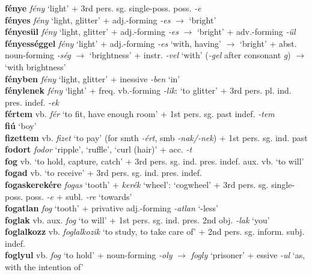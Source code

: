 \documentclass[11pt]{article}
\begin{document}
\textbf{fénye} \emph{fény} `light' + 3rd
pers. sg. single\hyp{}poss. poss. \emph{-e} \\
\textbf{fényes} \emph{fény} `light, glitter' + adj.\hyp{}forming \emph{-es}
$\rightarrow$ `bright' \\
\textbf{fényesül} \emph{fény} `light, glitter' + adj.\hyp{}forming \emph{-es}
$\rightarrow$ `bright' + adv.\hyp{}forming \emph{-ül} \\
\textbf{fényességgel} \emph{fény} `light' + adj.\hyp{}forming \emph{-es}
    `with, having' $\rightarrow$ `bright' + abst. noun\hyp{}forming
  \emph{-ség} $\rightarrow$ `brightness' +
  instr. \emph{-vel} `with' (\emph{-gel} after consonant
  \emph{g}) $\rightarrow$ `with brightness' \\
\textbf{fényben} \emph{fény} `light, glitter' + inessive \emph{-ben}
`in' \\
\textbf{fénylenek} \emph{fény} `light' +
freq. vb.\hyp{}forming \emph{-lik}: `to glitter' + 3rd
pers. pl. ind. pres. indef. \emph{-ek} \\
\textbf{fértem} vb. \emph{fér} `to fit, have enough room' + 1st
pers. sg. past indef. \emph{-tem} \\
\textbf{fiú} `boy' \\
\textbf{fizettem} vb. \emph{fizet} `to pay' (for smth \emph{-ért},
smb \emph{-nak/-nek}) + 1st pers. sg. ind. past \\
\textbf{fodort} \emph{fodor} `ripple', `ruffle', `curl (hair)' +
acc. \emph{-t} \\
\textbf{fog} vb. `to hold, capture, catch' + 3rd
pers. sg. ind. pres. indef. \textbar\textbar{} aux. vb. `to will' \\
\textbf{fogad} vb. `to receive' + 3rd pers. sg. ind. pres. indef. \\
\textbf{fogaskerekére} \emph{fogas} `tooth' + \emph{kerék} `wheel':
`cogwheel' + 3rd pers. sg. single\hyp{}poss. poss. \emph{-e} + subl. \emph{-re}
`towards' \\
\textbf{fogatlan} \emph{fog} `tooth' +
privative adj.\hyp{}forming \emph{-atlan} `-less' \\
\textbf{foglak} vb. aux. \emph{fog} `to will' + 1st
pers. sg. ind. pres. 2nd obj. \emph{-lak} `you' \\
\textbf{foglalkozz} vb. \emph{foglalkozik} `to study, to take care
of' + 2nd pers. sg. inform. subj. indef. \\
\textbf{foglyul} vb. \emph{fog} `to hold' + noun\hyp{}forming \emph{-oly} $\rightarrow$ \emph{fogly} `prisoner' + essive
  \emph{-ul} `as, with the intention of' \\
\end{document}
